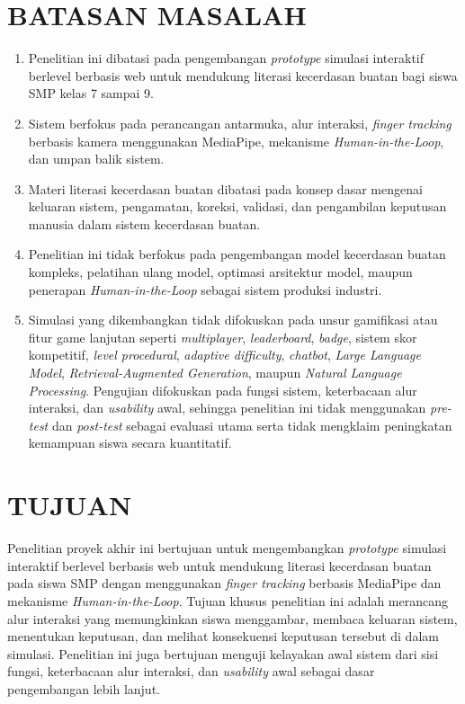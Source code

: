 \documentclass[10pt,twoside,openright]{report}
\begin{document}
\section{BATASAN MASALAH}
\label{sec:batasan-masalah}

\begin{enumerate}
    \item Penelitian ini dibatasi pada pengembangan \textit{prototype} simulasi interaktif berlevel berbasis web untuk mendukung literasi kecerdasan buatan bagi siswa SMP kelas 7 sampai 9.
    \item Sistem berfokus pada perancangan antarmuka, alur interaksi, \textit{finger tracking} berbasis kamera menggunakan MediaPipe, mekanisme \textit{Human-in-the-Loop}, dan umpan balik sistem.
    \item Materi literasi kecerdasan buatan dibatasi pada konsep dasar mengenai keluaran sistem, pengamatan, koreksi, validasi, dan pengambilan keputusan manusia dalam sistem kecerdasan buatan.
    \item Penelitian ini tidak berfokus pada pengembangan model kecerdasan buatan kompleks, pelatihan ulang model, optimasi arsitektur model, maupun penerapan \textit{Human-in-the-Loop} sebagai sistem produksi industri.
    \item Simulasi yang dikembangkan tidak difokuskan pada unsur gamifikasi atau fitur game lanjutan seperti \textit{multiplayer}, \textit{leaderboard}, \textit{badge}, sistem skor kompetitif, \textit{level procedural}, \textit{adaptive difficulty}, \textit{chatbot}, \textit{Large Language Model}, \textit{Retrieval-Augmented Generation}, maupun \textit{Natural Language Processing}. Pengujian difokuskan pada fungsi sistem, keterbacaan alur interaksi, dan \textit{usability} awal, sehingga penelitian ini tidak menggunakan \textit{pre-test} dan \textit{post-test} sebagai evaluasi utama serta tidak mengklaim peningkatan kemampuan siswa secara kuantitatif.
\end{enumerate}

\section{TUJUAN}
\label{sec:tujuan}

Penelitian proyek akhir ini bertujuan untuk mengembangkan \textit{prototype} simulasi interaktif berlevel berbasis web untuk mendukung literasi kecerdasan buatan pada siswa SMP dengan menggunakan \textit{finger tracking} berbasis MediaPipe dan mekanisme \textit{Human-in-the-Loop}. Tujuan khusus penelitian ini adalah merancang alur interaksi yang memungkinkan siswa menggambar, membaca keluaran sistem, menentukan keputusan, dan melihat konsekuensi keputusan tersebut di dalam simulasi. Penelitian ini juga bertujuan menguji kelayakan awal sistem dari sisi fungsi, keterbacaan alur interaksi, dan \textit{usability} awal sebagai dasar pengembangan lebih lanjut.
\end{document}
